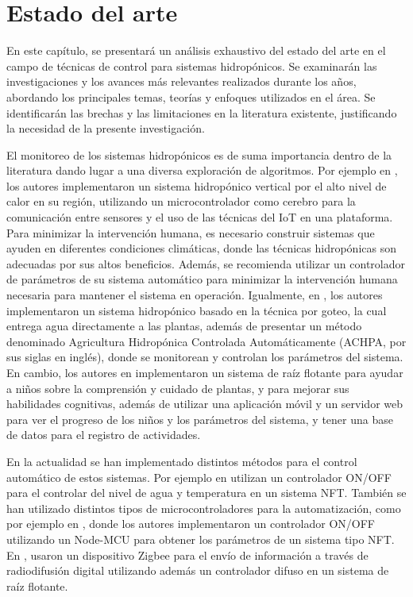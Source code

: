 
\chapter{Estado del arte} \label{chap:EstadoDelArte} 

En este capítulo, se presentará un análisis exhaustivo del estado del arte en el campo de técnicas de control para sistemas hidropónicos. Se examinarán las investigaciones y los avances más relevantes realizados durante los años, abordando los principales temas, teorías y enfoques utilizados en el área. Se identificarán las brechas y las limitaciones en la literatura existente, justificando la necesidad de la presente investigación. 

El monitoreo de los sistemas hidropónicos es de suma importancia dentro de la literatura dando lugar a una diversa exploración de algoritmos. Por ejemplo en \cite{chowdhury2020design}, los autores implementaron un sistema hidropónico vertical por el alto nivel de calor en su región, utilizando un microcontrolador como cerebro para la comunicación entre sensores y el uso de las técnicas del IoT en una plataforma. Para minimizar la intervención humana, es necesario construir sistemas que ayuden en diferentes condiciones climáticas, donde las técnicas hidropónicas son adecuadas por sus altos beneficios. Además, se recomienda utilizar un controlador de parámetros de su sistema automático para minimizar la intervención humana necesaria para mantener el sistema en operación. Igualmente, en \cite{siddiq2019achpa}, los autores implementaron un sistema hidropónico basado en la técnica por goteo, la cual entrega agua directamente a las plantas, además de presentar un método denominado Agricultura Hidropónica Controlada Automáticamente (ACHPA, por sus siglas en inglés), donde se monitorean y controlan los parámetros del sistema. En cambio, los autores en \cite{dinccer2019smart} implementaron un sistema de raíz flotante para ayudar a niños sobre la comprensión y cuidado de plantas, y para mejorar sus habilidades cognitivas, además de utilizar una aplicación móvil y un servidor web para ver el progreso de los niños y los parámetros del sistema, y tener una base de datos para el registro de actividades. 

En la actualidad se han implementado distintos métodos para el control automático de estos sistemas. Por ejemplo en \cite{untoro2022iot} utilizan un controlador ON/OFF para el controlar del nivel de agua y temperatura en un sistema NFT. También se han utilizado distintos tipos de microcontroladores para la automatización, como por ejemplo en \cite{patil2020monitoring}, donde los autores implementaron un controlador ON/OFF utilizando un Node-MCU para obtener los parámetros de un sistema tipo NFT. En \cite{tatas2022reliable}, usaron un dispositivo Zigbee para el envío de información a través de radiodifusión digital utilizando además un controlador difuso en un sistema de raíz flotante.


